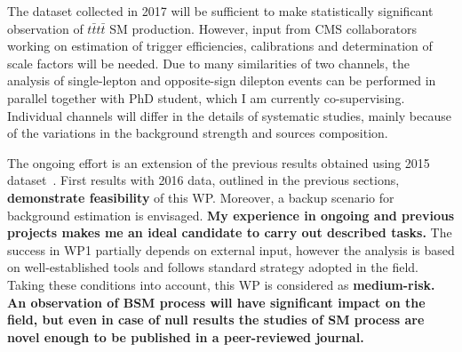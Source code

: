 \textcolor{\mynew}{
The dataset collected in 2017 will be sufficient to make statistically significant observation of $t\bar{t}t\bar{t}$ SM production. However, input from CMS collaborators working on estimation of trigger efficiencies, calibrations and determination of scale factors will be needed. Due to many similarities of two channels, the analysis of single-lepton and opposite-sign dilepton events can be performed in parallel together with PhD student, which I am currently co-supervising. Individual channels will differ in the details of systematic studies, mainly because of the variations in the background strength and sources composition. 
}

\textcolor{\mynew}{
The ongoing effort is an extension of the previous results obtained using 2015 dataset~\cite{Sirunyan:2017tep}. First results with 2016 data, outlined in the previous sections, \textbf{demonstrate feasibility} of this WP. Moreover, a backup scenario for background estimation is envisaged. \textbf{My experience in ongoing and previous projects makes me an ideal candidate to carry out described tasks.}
The success in WP1 partially depends on external input, however the analysis is based on well-established tools and follows standard strategy adopted in the field. Taking these conditions into account, this WP is considered as \textbf{medium-risk.} \textbf{An observation of BSM process will have significant impact on the field, but even in case of null results the studies of SM \tttt process are novel enough to be published in a peer-reviewed journal.}
}